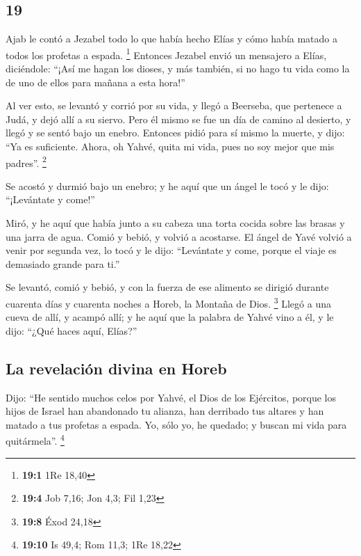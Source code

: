 \begin{paracol}{2}
\hypertarget{section-36}{%
\section{19}\label{section-36}}

 Ajab le contó a Jezabel todo lo que había hecho Elías y
cómo había matado a todos los profetas a espada. \footnote{\textbf{19:1}
  1Re 18,40}  Entonces Jezabel envió un mensajero a Elías,
diciéndole: ``¡Así me hagan los dioses, y más también, si no hago tu
vida como la de uno de ellos para mañana a esta hora!''

 Al ver esto, se levantó y corrió por su vida, y llegó a
Beerseba, que pertenece a Judá, y dejó allí a su siervo. 
Pero él mismo se fue un día de camino al desierto, y llegó y se sentó
bajo un enebro. Entonces pidió para sí mismo la muerte, y dijo: ``Ya es
suficiente. Ahora, oh Yahvé, quita mi vida, pues no soy mejor que mis
padres''. \footnote{\textbf{19:4} Job 7,16; Jon 4,3; Fil 1,23}

 Se acostó y durmió bajo un enebro; y he aquí que un ángel
le tocó y le dijo: ``¡Levántate y come!''

 Miró, y he aquí que había junto a su cabeza una torta
cocida sobre las brasas y una jarra de agua. Comió y bebió, y volvió a
acostarse.  El ángel de Yavé volvió a venir por segunda
vez, lo tocó y le dijo: ``Levántate y come, porque el viaje es demasiado
grande para ti.''

 Se levantó, comió y bebió, y con la fuerza de ese
alimento se dirigió durante cuarenta días y cuarenta noches a Horeb, la
Montaña de Dios. \footnote{\textbf{19:8} Éxod 24,18} 
Llegó a una cueva de allí, y acampó allí; y he aquí que la palabra de
Yahvé vino a él, y le dijo: ``¿Qué haces aquí, Elías?''

\hypertarget{la-revelaciuxf3n-divina-en-horeb}{%
\subsection{La revelación divina en
Horeb}\label{la-revelaciuxf3n-divina-en-horeb}}

 Dijo: ``He sentido muchos celos por Yahvé, el Dios de
los Ejércitos, porque los hijos de Israel han abandonado tu alianza, han
derribado tus altares y han matado a tus profetas a espada. Yo, sólo yo,
he quedado; y buscan mi vida para quitármela''. \footnote{\textbf{19:10}
  Is 49,4; Rom 11,3; 1Re 18,22}


\end{paracol}
